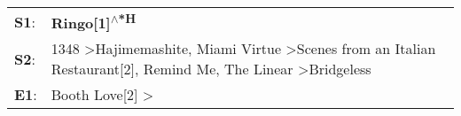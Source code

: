 \begin{supertabular}{p{0.03\textwidth}p{0.92\textwidth}}
 \textbf{S1}:  &                                                                                                                                                                                                                                                                                       \textbf{Ringo[1]\textsuperscript{$\wedge$*H}}  \enspace  \\
 \textbf{S2}:  &  1348\textsuperscript{} \textgreater \enspace Hajimemashite\textsuperscript{}, \enspace Miami Virtue\textsuperscript{} \textgreater \enspace Scenes from an Italian Restaurant[2]\textsuperscript{}, \enspace Remind Me\textsuperscript{}, \enspace The Linear\textsuperscript{} \textgreater \enspace Bridgeless\textsuperscript{}  \enspace  \\
 \textbf{E1}:  &                                                                                                                                                                                                                                                        Booth Love[2]\textsuperscript{} \textgreater {}\textsuperscript{}  \enspace  \\
\end{supertabular}
